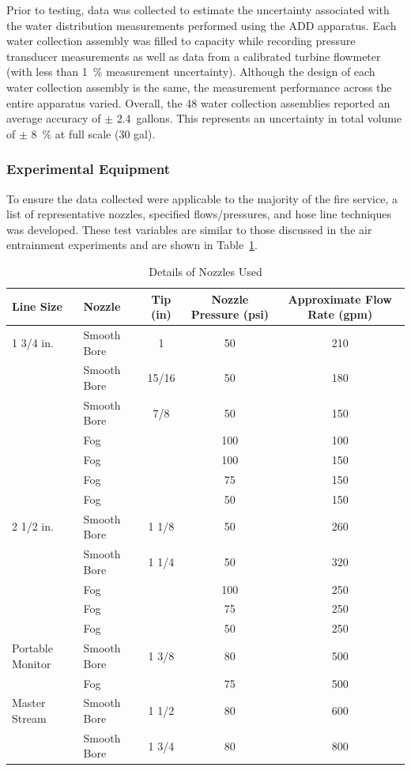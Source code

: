 \documentclass{article}
\begin{document}
Prior to testing, data was collected to estimate the uncertainty associated with the water distribution measurements performed using the ADD apparatus. Each water collection assembly was filled to capacity while recording pressure transducer measurements as well as data from a calibrated turbine flowmeter (with less than 1~\% measurement uncertainty). Although the design of each water collection assembly is the same, the measurement performance across the entire apparatus varied. Overall, the 48 water collection assemblies reported an average accuracy of $\pm$ 2.4~gallons. This represents an uncertainty in total volume of $\pm$ 8~\% at full scale (30 gal).

\subsubsection{Experimental Equipment}

To ensure the data collected were applicable to the majority of the fire service, a list of representative nozzles, specified flows/pressures, and hose line techniques was developed. These test variables are similar to those discussed in the air entrainment experiments and are shown in Table~\ref{tab:nozzles_used_detail}.

\begin{table}[!ht]
\centering
\caption{Details of Nozzles Used}
\label{tab:nozzles_used_detail}
\begin{tabular}{llccc}
\toprule[1.5pt]
{\textbf{Line Size}} & {\textbf{Nozzle}} & {\textbf{Tip (in)}} & {\textbf{Nozzle Pressure (psi)}} & \textbf{Approximate Flow Rate (gpm)} \\ 
\midrule
1 3/4 in. & Smooth Bore & 1      & 50 & 210 \\
          & Smooth Bore & 15/16  & 50 & 180 \\
          & Smooth Bore & 7/8    & 50 & 150 \\
          & Fog         &        & 100 & 100 \\
          & Fog         &        & 100 & 150 \\
          & Fog         &        & 75 & 150 \\
          & Fog         &        & 50 & 150 \\ \midrule
2 1/2 in. & Smooth Bore & 1 1/8  & 50 & 260 \\
          & Smooth Bore & 1 1/4  & 50 & 320 \\
          & Fog         &        & 100 & 250 \\
          & Fog         &        & 75 & 250 \\
          & Fog         &        & 50 & 250 \\ \midrule
Portable Monitor & Smooth Bore & 1 3/8 & 80 & 500 \\
          & Fog         &        & 75 & 500 \\ \midrule
Master Stream & Smooth Bore & 1 1/2 & 80 & 600 \\
          & Smooth Bore & 1 3/4  & 80 & 800 \\
\bottomrule[1.25pt]
\end{tabular}
\end{table}
\end{document}
